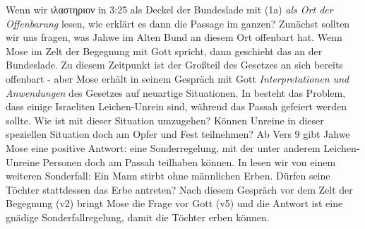 Wenn wir ιλαστηριον in 3:25 als Deckel der Bundeslade mit (1a) \textit{als Ort der Offenbarung} lesen, wie erklärt es dann die Passage im ganzen?
Zunächst sollten wir uns fragen, was Jahwe im Alten Bund an diesem Ort offenbart hat.
Wenn Mose im Zelt der Begegnung mit Gott spricht, dann geschieht das an der Bundeslade.
Zu diesem Zeitpunkt ist der Großteil des Gesetzes an sich bereits offenbart - aber Mose erhält in seinem Gespräch mit Gott
\textit{Interpretationen und Anwendungen} des Gesetzes auf neuartige Situationen.
In  besteht das Problem, dass einige Israeliten Leichen-Unrein sind, während das Passah gefeiert werden sollte.
Wie ist mit dieser Situation umzugehen? Können Unreine in dieser speziellen Situation doch am Opfer und Fest teilnehmen?
Ab Vers 9 gibt Jahwe Mose eine positive Antwort: eine Sonderregelung, mit der unter anderem Leichen-Unreine Personen doch am Passah teilhaben können.
In  lesen wir von einem weiteren Sonderfall: Ein Mann stirbt ohne männlichen Erben.
Dürfen seine Töchter stattdessen das Erbe antreten?
Nach diesem Gespräch vor dem Zelt der Begegnung (v2) bringt Mose die Frage vor Gott (v5) und die Antwort ist eine gnädige Sonderfallregelung,
damit die Töchter erben können.

